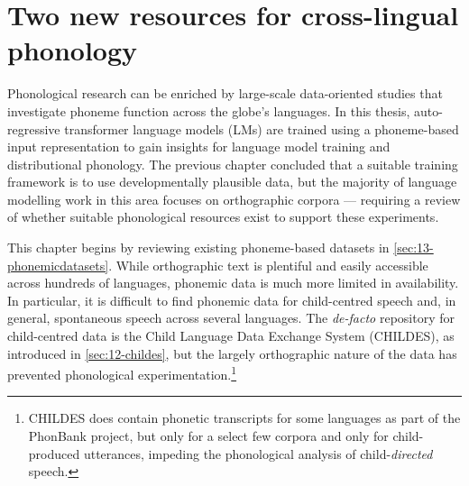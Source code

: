 \chapter{Two new resources for cross-lingual phonology}\label{chapter:resources}


Phonological research can be enriched by large-scale data-oriented studies that investigate phoneme function across the globe's languages. In this thesis, auto-regressive transformer language models (LMs) are trained using a phoneme-based input representation to gain insights for language model training and distributional phonology. The previous chapter concluded that a suitable training framework is to use developmentally plausible data, but the majority of language modelling work in this area focuses on orthographic corpora --- requiring a review of whether suitable phonological resources exist to support these experiments.


This chapter begins by reviewing existing phoneme-based datasets in \cref{sec:13-phonemicdatasets}. While orthographic text is plentiful and easily accessible across hundreds of languages, phonemic data is much more limited in availability. In particular, it is difficult to find phonemic data for child-centred speech and, in general, spontaneous speech across several languages. The \emph{de-facto} repository for child-centred data is the Child Language Data Exchange System (CHILDES), as introduced in \cref{sec:12-childes}, but the largely orthographic nature of the data has prevented phonological experimentation.\footnote{CHILDES does contain phonetic transcripts for some languages as part of the PhonBank project, but only for a select few corpora and only for child-produced utterances, impeding the phonological analysis of child-\emph{directed} speech.} 


